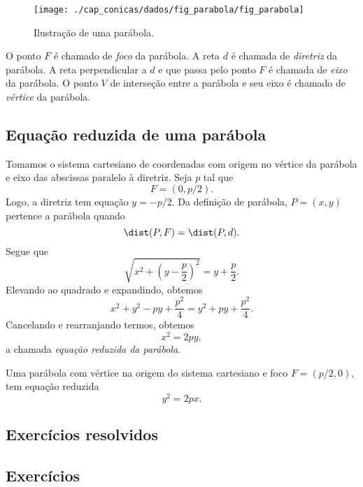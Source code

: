 \begin{figure}[H]
  \centering
  \texttt{[image: ./cap\_conicas/dados/fig\_parabola/fig\_parabola]}
  \caption{Ilustração de uma parábola.}
  \label{fig:parabola}
\end{figure}

O ponto $F$ é chamado de \emph{foco} da parábola. A reta $d$ é chamada de \emph{diretriz} da parábola. A reta perpendicular a $d$ e que passa pelo ponto $F$ é chamada de \emph{eixo} da parábola. O ponto $V$ de interseção entre a parábola e seu eixo é chamado de \emph{vértice} da parábola.

\subsection{Equação reduzida de uma parábola}

Tomamos o sistema cartesiano de coordenadas com origem no vértice da parábola e eixo das abscissas paralelo à diretriz. Seja $p$ tal que
\begin{equation}
  F = (0,p/2).
\end{equation}
Logo, a diretriz tem equação $y = -p/2$. Da definição de parábola, $P=(x,y)$ pertence a parábola quando
\begin{equation}
  \dist(P,F) = \dist(P,d).
\end{equation}
Segue que
\begin{equation}
  \sqrt{x^2+\left(y-\frac{p}{2}\right)^2} = y+\frac{p}{2}.
\end{equation}
Elevando ao quadrado e expandindo, obtemos
\begin{equation}
  x^2 + y^2-py+\frac{p^2}{4} = y^2 + py + \frac{p^2}{4}.
\end{equation}
Cancelando e rearranjando termos, obtemos
\begin{equation}
  x^2 = 2py,
\end{equation}
a chamada \emph{equação reduzida da parábola}.

\begin{obs}
  Uma parábola com vértice na origem do sistema cartesiano e foco $F=(p/2, 0)$, tem equação reduzida
  \begin{equation}
    y^2 = 2px.
  \end{equation}
\end{obs}

\subsection*{Exercícios resolvidos}

\emconstrucao

\subsection*{Exercícios}

\emconstrucao